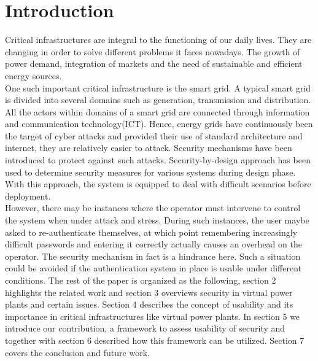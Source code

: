 \section{Introduction}

Critical infrastructures are integral to the functioning of our daily lives. They are changing in order to solve different problems it faces nowadays. The growth of power demand, integration of markets and the need of sustainable and efficient energy sources. \\
One such important critical infrastructure is the smart grid. A typical smart grid is divided into several domains such as generation, transmission and distribution. All the actors within domains of a smart grid are connected through information and communication technology(ICT). Hence, energy grids have continuously been the target of cyber attacks and provided their use of standard architecture and internet, they are relatively easier to attack. Security mechanisms have been introduced to protect against such attacks. Security-by-design approach has been used to determine security measures for various systems during design phase. With this approach, the system is equipped to deal with difficult scenarios before deployment. \\ However, there may be instances where the operator must intervene to control the system when under attack and stress. During such instances, the user maybe asked to re-authenticate themselves, at which point remembering increasingly difficult passwords and entering it correctly actually causes an overhead on the operator. The security mechanism in fact is a hindrance here. Such a situation could be avoided if the authentication system in place is usable under different conditions. The rest of the paper is organized as the following, section 2 highlights the related work and section 3 overviews security in virtual power plants and certain issues. Section 4 describes the concept of usability and its importance in critical infrastructures like virtual power plants. In section 5 we introduce our contribution, a framework to assess usability of security and together with section 6 described how this framework can be utilized. Section 7 covers the conclusion and future work.



